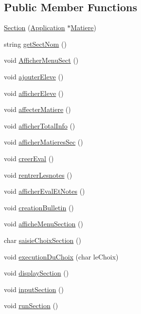 \subsection*{Public Member Functions}
\begin{DoxyCompactItemize}
\item 
\hyperlink{class_section_a288017c7bfd0fe6aee6e29bae921c7ee}{Section} (\hyperlink{class_application}{Application} $\ast$\hyperlink{class_matiere}{Matiere})
\item 
string \hyperlink{class_section_a33720a47c81f2380b945dec28b8e39d7}{get\+Sect\+Nom} ()
\item 
void \hyperlink{class_section_a93b414675ebd2667409a44a9b986cc4f}{Afficher\+Menu\+Sect} ()
\item 
void \hyperlink{class_section_afa8816db504195a8c1f5c9d8c3ccbd34}{ajouter\+Eleve} ()
\item 
void \hyperlink{class_section_a367d97fad77c046a78aa6dd0ce7a9315}{afficher\+Eleve} ()
\item 
void \hyperlink{class_section_a0b7c4fec05a94910766becb5291e44cb}{affecter\+Matiere} ()
\item 
void \hyperlink{class_section_a4ba7e1644f017aebc9f8721a0ede4ee6}{afficher\+Total\+Info} ()
\item 
void \hyperlink{class_section_ac6e6d0f8dafcb0854c164df62dfc2bde}{afficher\+Matieres\+Sec} ()
\item 
void \hyperlink{class_section_afeff96d837b03663d9820fc80d1479ed}{creer\+Eval} ()
\item 
void \hyperlink{class_section_a08e8460e2b2cb7b4e69564bd45c8929f}{rentrer\+Lesnotes} ()
\item 
void \hyperlink{class_section_abc1815ec698a6510d8315551bb792ea9}{afficher\+Eval\+Et\+Notes} ()
\item 
void \hyperlink{class_section_a9c8ed068a26b1c29cff8597a0a13c2ae}{creation\+Bulletin} ()
\item 
void \hyperlink{class_section_a01b0acae2cd1395aa949ff8ba18b307a}{affiche\+Menu\+Section} ()
\item 
char \hyperlink{class_section_a90b49e866488408b450a6bda081e5b44}{saisie\+Choix\+Section} ()
\item 
void \hyperlink{class_section_ae1f045a129fdfa23ce6b22dcb3804ae9}{execution\+Du\+Choix} (char le\+Choix)
\item 
void \hyperlink{class_section_a205214883dcdb8072b1809b824ec6d61}{display\+Section} ()
\item 
void \hyperlink{class_section_af69c83c806b1d0b934f788aedb91a45a}{input\+Section} ()
\item 
void \hyperlink{class_section_a27cba40cc111707559dce0dfd4c5bf61}{run\+Section} ()
\end{DoxyCompactItemize}
